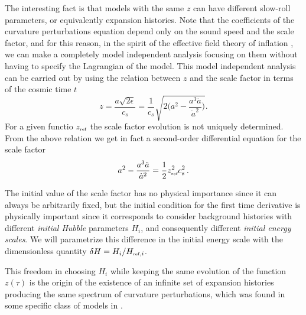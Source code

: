 \documentclass[aps,prl,amsmath,nofootinbib,twocolumn]{revtex4}
\newcommand{\3}{\partial}
\newcommand{\4}{\frac}
\newcommand{\5}{\delta}
\renewcommand\({\left(}
\renewcommand\){\right)}
\renewcommand\[{\left[}
\renewcommand\]{\right]}
\newcommand{\reff}{{\mbox{\tiny ref}}}
\begin{document}
The interesting fact is that models with the same $z$ can have different slow-roll parameters, or equivalently expansion histories. 
Note that the coefficients of the curvature perturbations equation depend only on the sound speed and the scale factor, and for this reason, in the spirit of the effective field theory of inflation \cite{Cheung:2007st}, we can make a completely model independent analysis focusing on them without having to specify the Lagrangian of the model. This model independent analysis can be carried out by using the relation between $z$ and the scale factor in terms of the cosmic time $t$
\begin{equation}\label{eq:z}
z=\frac{a\sqrt{2\epsilon}}{c_s}= \frac{1}{c_s} \sqrt{2\Biggl(a^2 - \frac{ a^3 \ddot{a}}{\dot{a}^2}\Biggl)}.
\end{equation}
For a given functio $z_\reff$ the scale factor evolution is not uniquely determined.
From the above relation we get in fact a  second-order differential equation for the scale factor
\begin{equation}\label{eq:diffa}
a^2 - \frac{ a^3 \ddot{a}}{\dot{a}^2} = \frac{1}{2} z_\reff^2 c_s^2\,.
\end{equation}

 The initial value of the scale factor has no physical importance since it can always be arbitrarily fixed, but the initial condition for the first time derivative is physically important since it corresponds to consider background histories with different \textit{initial Hubble} parameters $H_i$, and consequently different  \textit{initial energy scales}. We will parametrize this difference in the initial energy scale with the dimensionless quantity $\delta H=H_i/H_{\reff, i}$.
 
This freedom in choosing $H_i$ while keeping the same evolution of the function $z(\tau)$ is the origin of the existence of an infinite set of expansion histories producing the same spectrum of curvature perturbations, which was found in some specific class of models in \cite{GallegoCadavid:2017bzb}.

\end{document}
